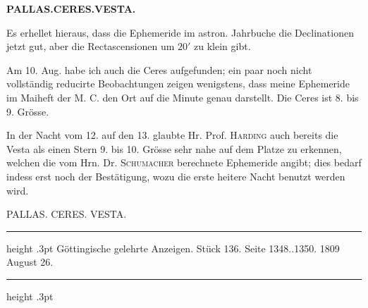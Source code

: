 \clearpage
\thispagestyle{empty}
\noindent{}%
\makebox[12mm][l]{}%
\parbox[t]{\dimexpr\linewidth-24mm\relax}{\centering\footnotesize\bfseries PALLAS.\enspace CERES.\enspace VESTA.\par}%
\par\nobreak\medskip
\par\indent Es erhellet hieraus, dass die Ephemeride im astron. Jahrbuche die Declinationen jetzt gut, aber die Rectascensionen um $20'$ zu klein gibt.

\par\indent Am 10. Aug. habe ich auch die Ceres aufgefunden; ein paar noch nicht vollständig reducirte Beobachtungen zeigen wenigstens, dass meine Ephemeride im Maiheft der M. C. den Ort auf die Minute genau darstellt. Die Ceres ist 8. bis 9. Grösse.

\par\indent In der Nacht vom 12. auf den 13. glaubte Hr. Prof. \textsc{Harding} auch bereits die Vesta als einen Stern 9. bis 10. Grösse sehr nahe auf dem Platze zu erkennen, welchen die vom Hrn. Dr.
\textsc{Schumacher} berechnete Ephemeride angibt; dies bedarf indess erst noch der Bestätigung, wozu die erste heitere Nacht benutzt werden wird.

\par\bigskip
{}
\begin{center}\large PALLAS. CERES. VESTA.\end{center}
\begin{center}\parbox{.90\linewidth}{\centering\footnotesize\frenchspacing
\hrule height .3pt\relax\vspace{2.5pt}
Göttingische gelehrte Anzeigen. Stück 136. Seite 1348..1350. 1809 August 26.\par
\vspace{2.5pt}\hrule height .3pt\relax
}\end{center}

